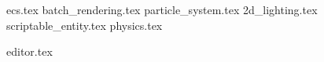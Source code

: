 \newpage

{ecs.tex}
{batch_rendering.tex}
{particle_system.tex}
{2d_lighting.tex}
{scriptable_entity.tex}
{physics.tex}

{editor.tex}

\newpage